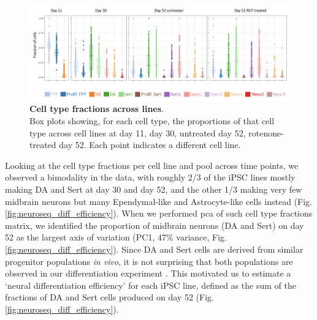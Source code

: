 \begin{figure}[h]
\includegraphics[width=15.5cm]{Chapter5/Fig/neuroseq_line_celltype.png}
\caption[Cell type fractions across lines]{\textbf{Cell type fractions across lines}.\\
Box plots showing, for each cell type, the proportions of that cell type across cell lines at day 11, day 30, untreated day 52, rotenone-treated day 52. 
Each point indicates a different cell line.}
\label{fig:neuroseq_line_variation}
\end{figure}


Looking at the cell type fractions per cell line and pool across time points, we observed a bimodality in the data, with roughly 2/3 of the iPSC lines mostly making DA and Sert at day 30 and day 52, and the other 1/3 making very few midbrain neurons but many Ependymal-like and Astrocyte-like cells instead (Fig. \ref{fig:neuroseq_diff_efficiency}).
When we performed \gls{pca} of such cell type fractions matrix, we identified the proportion of midbrain neurons (DA and Sert) on day 52 as the largest axis of variation (PC1, 47\% variance, Fig. \ref{fig:neuroseq_diff_efficiency}). 
Since DA and Sert cells are derived from similar progenitor populations \textit{in vivo}, it is not surprising that both populations are observed in our differentiation experiment \cite{ye1998fgf, cao2017characterization}. 
This motivated us to estimate a `neural differentiation efficiency' for each iPSC line, defined as the sum of the fractions of DA and Sert cells produced on day 52 (Fig. \ref{fig:neuroseq_diff_efficiency}). 
\\

